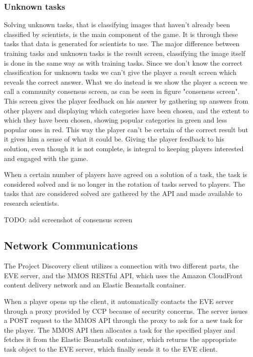 	\subsubsection{Unknown tasks}
		Solving unknown tasks, that is classifying images that haven't already been classified by scientists, is the main component of the game. It is through these tasks that data is generated for scientists to use. The major difference between training tasks and unknown tasks is the result screen, classifying the image itself is done in the same way as with training tasks. Since we don't know the correct classification for unknown tasks we can't give the player a result screen which reveals the correct answer. What we do instead is we show the player a screen we call a community consensus screen, as can be seen in figure "consensus screen". This screen gives the player feedback on his answer by gathering up answers from other players and displaying which categories have been chosen, and the extent to which they have been chosen, showing popular categories in green and less popular ones in red. This way the player can't be certain of the correct result but it gives him a sense of what it could be. Giving the player feedback to his solution, even though it is not complete, is integral to keeping players interested and engaged with the game.

		When a certain number of players have agreed on a solution of a task, the task is considered solved and is no longer in the rotation of tasks served to players. The tasks that are considered solved are gathered by the API and made available to research scientists.

		TODO: add screenshot of consensus screen

\subsection{Network Communications}
	The Project Discovery client utilizes a connection with two different parts, the EVE server, and the MMOS RESTful API, which uses the Amazon CloudFront content delivery network and an Elastic Beanstalk container.

	When a player opens up the client, it automatically contacts the EVE server through a proxy provided by CCP because of security concerns. The server issues a POST request to the MMOS API through the proxy to ask for a new task for the player. The MMOS API then allocates a task for the specified player and fetches it from the Elastic Beanstalk container, which returns the appropriate task object to the EVE server, which finally sends it to the EVE client. 

